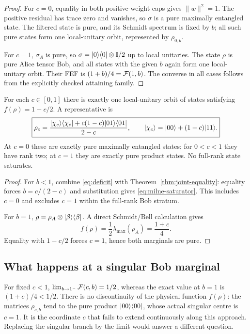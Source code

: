 \begin{proof}
For $c=0$, equality in both positive-weight caps gives $\|w\|^2=1$. The positive residual has trace zero and vanishes, so $\sigma$ is a pure maximally entangled state. The filtered state is pure, and its Schmidt spectrum is fixed by $b$; all such pure states form one local-unitary orbit, represented by $\rho_{0,b}$.

For $c=1$, $\sigma_A$ is pure, so $\sigma=\lvert 0\rangle\langle 0\rvert\otimes\mathbb I/2$ up to local unitaries. The state $\rho$ is pure Alice tensor Bob, and all states with the given $b$ again form one local-unitary orbit. Their FEF is $(1+b)/4=\mathcal F(1,b)$. The converse in all cases follows from the explicitly checked attaining family.\end{proof}

\begin{corollary}\label{cor:original-equality}
For each $c\in[0,1]$ there is exactly one local-unitary orbit of states satisfying $f(\rho)=1-c/2$. A representative is
\begin{equation}\label{eq:milne-saturator}
 \boxed{\rho_c=
 \frac{\lvert \chi_c\rangle\langle \chi_c\rvert+c(1-c)\lvert 01\rangle\langle 01\rvert}{2-c},
 \qquad\lvert \chi_c\rangle=\lvert 00\rangle+(1-c)\lvert 11\rangle.}
\end{equation}
At $c=0$ these are exactly pure maximally entangled states; for $0<c<1$ they have rank two; at $c=1$ they are exactly pure product states. No full-rank state saturates.
\end{corollary}
\begin{proof}
For $b<1$, combine \eqref{eq:deficit} with Theorem~\ref{thm:joint-equality}: equality forces $b=c/(2-c)$ and substitution gives \eqref{eq:milne-saturator}. This includes $c=0$ and excludes $c=1$ within the full-rank Bob stratum.

For $b=1$, $\rho=\rho_A\otimes\lvert \beta\rangle\langle \beta\rvert$. A direct Schmidt/Bell calculation gives
\begin{equation}\label{eq:singular}
 f(\rho)=\frac12\lambda_{\max}(\rho_A)=\frac{1+c}{4}.
\end{equation}
Equality with $1-c/2$ forces $c=1$, hence both marginals are pure.\end{proof}

\subsection{What happens at a singular Bob marginal}
For fixed $c<1$, $\lim_{b\to1^-}\mathcal F(c,b)=1/2$, whereas the exact value at $b=1$ is $(1+c)/4<1/2$. There is no discontinuity of the physical function $f(\rho)$: the matrices $\rho_{c,b}$ tend to the pure product $\lvert 00\rangle\langle 00\rvert$, whose actual singular centre is $c=1$. It is the coordinate $c$ that fails to extend continuously along this approach. Replacing the singular branch by the limit would answer a different question.


